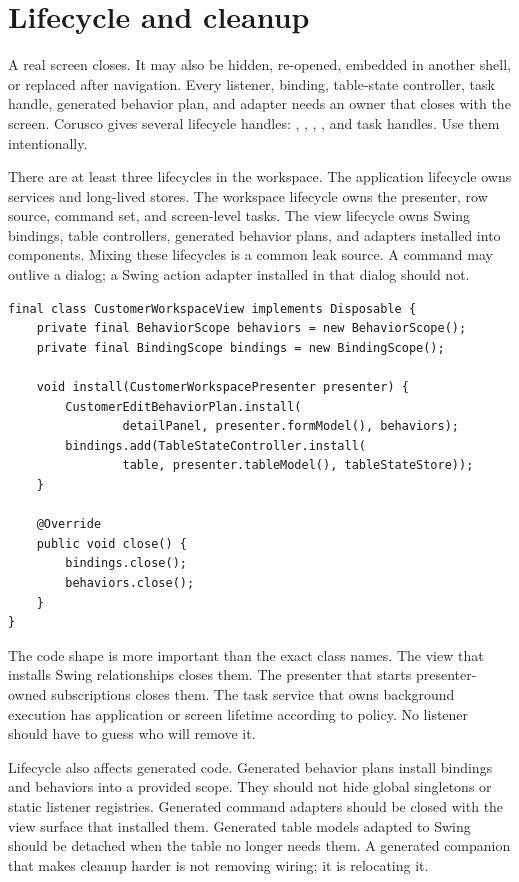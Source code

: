 \section{Lifecycle and cleanup}

A real screen closes. It may also be hidden, re-opened, embedded in another
shell, or replaced after navigation. Every listener, binding, table-state
controller, task handle, generated behavior plan, and adapter needs an owner
that closes with the screen. Corusco gives several lifecycle handles:
, , ,
, and task handles. Use them intentionally.

There are at least three lifecycles in the workspace. The application
lifecycle owns services and long-lived stores. The workspace lifecycle owns
the presenter, row source, command set, and screen-level tasks. The view
lifecycle owns Swing bindings, table controllers, generated behavior plans,
and adapters installed into components. Mixing these lifecycles is a common
leak source. A command may outlive a dialog; a Swing action adapter installed
in that dialog should not.

\begin{lstlisting}[caption={View lifecycle owns Swing installations.}]
final class CustomerWorkspaceView implements Disposable {
    private final BehaviorScope behaviors = new BehaviorScope();
    private final BindingScope bindings = new BindingScope();

    void install(CustomerWorkspacePresenter presenter) {
        CustomerEditBehaviorPlan.install(
                detailPanel, presenter.formModel(), behaviors);
        bindings.add(TableStateController.install(
                table, presenter.tableModel(), tableStateStore));
    }

    @Override
    public void close() {
        bindings.close();
        behaviors.close();
    }
}
\end{lstlisting}

The code shape is more important than the exact class names. The view that
installs Swing relationships closes them. The presenter that starts
presenter-owned subscriptions closes them. The task service that owns
background execution has application or screen lifetime according to policy.
No listener should have to guess who will remove it.

Lifecycle also affects generated code. Generated behavior plans install
bindings and behaviors into a provided scope. They should not hide global
singletons or static listener registries. Generated command adapters should be
closed with the view surface that installed them. Generated table models
adapted to Swing should be detached when the table no longer needs them. A
generated companion that makes cleanup harder is not removing wiring; it is
relocating it.

